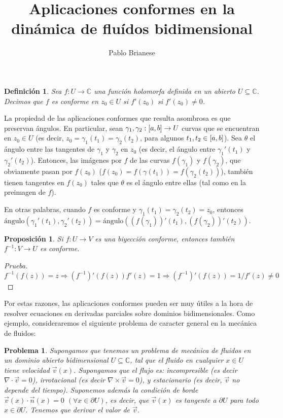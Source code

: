 \documentclass{article}
\title{Aplicaciones conformes en la dinámica de fluídos bidimensional}
\author{Pablo Brianese}
\newcommand{\complexNumbers}{\mathbb{C}}
\newcommand{\leftOpenInterval}{\left]}
\newcommand{\rightOpenInterval}{\right[}
\newcommand{\leftClosedInterval}{\left[}
\newcommand{\rightClosedInterval}{\right]}
\newcommand{\interval}[3]{%
    \ifstrequal{#1}{oo}{%
      \leftOpenInterval #2, #3 \rightOpenInterval%
    }{%
      \ifstrequal{#1}{co}{%
        \leftClosedInterval #2, #3 \rightOpenInterval%
      }{%
        \ifstrequal{#1}{oc}{
          \leftOpenInterval #2, #3 \rightClosedInterval%
        }{%
          \ifstrequal{#1}{cc}{
            \leftClosedInterval #2, #3 \rightClosedInterval
          }{%
          }%
        }%
      }%
    }%
  }
\newtheorem{proposition}{Proposición}
\newtheorem{problem}{Problema}
\newtheorem{definition}{Definición}
\theoremstyle{remark}
\begin{document}
  \maketitle
  \begin{definition}
    Sea \(f : U \rightarrow \complexNumbers\) una función holomorfa definida en un abierto \(U \subseteq \complexNumbers\).
    Decimos que \(f\) es conforme en \(z_0 \in U\) si \(f'(z_0)\) si \(f'(z_0) \neq 0\).
  \end{definition}

  La propiedad de las aplicaciones conformes que resulta asombrosa es que preservan ángulos.
  En particular, sean \(\gamma_1, \gamma_2 : \interval{cc}{a}{b} \rightarrow U\) curvas que se encuentran en \(z_0 \in U\) (es decir, \(z_0 = \gamma_1(t_1) = \gamma_2(t_2)\), para algunos \(t_1, t_2 \in \interval{cc}{a}{b}\)).
  Sea \(\theta\) el ángulo entre las tangentes de \(\gamma_1\) y \(\gamma_2\) en \(z_0\) (es decir, el ángulo entre \(\gamma_1'(t_1)\) y \(\gamma_2'(t_2)\)).
  Entonces, las imágenes por \(f\) de las curvas \(f(\gamma_1)\) y \(f(\gamma_2)\), que obviamente pasan por \(f(z_0)\) (\(f(z_0) = f(\gamma(t_1)) = f(\gamma_2(t_2))\)), también tienen tangentes en \(f(z_0)\) tales que \(\theta\) es el ángulo entre ellas (tal como en la preimagen de \(f\)).
  
  En otras palabras, cuando \(f\) es conforme y \(\gamma_1(t_1) = \gamma_2(t_2) = z_0\), entonces \(\text{ángulo}(\gamma_1'(t_1), \gamma_2'(t_2)) = \text{ángulo}((f(\gamma_1))'(t_1), (f(\gamma_2))'(t_2))\).

  \begin{proposition}
    Si \(f: U \rightarrow V\) es una biyección conforme, entonces también \(f^{-1} : V \rightarrow U\) es conforme.
  \end{proposition}
  \begin{proof}[Prueba]
    \({f^{-1} (f (z)) = z} \Rightarrow {(f^{- 1})'(f(z)) f'(z) = 1} \Rightarrow {(f^{-1})'(f(z)) = 1 / f'(z) \neq 0}\)
  \end{proof}

  Por estas razones, las aplicaciones conformes pueden ser muy útiles a la hora de resolver ecuaciones en derivadas parciales sobre dominios bidimensionales.
  Como ejemplo, consideraremos el siguiente problema de caracter general en la mecánica de fluidos:

  \begin{problem}
    Supongamos que tenemos un problema de mecánica de fluidos en un dominio abierto bidimensional \(U \subseteq \complexNumbers\), tal que el fluido en cualquier \(x \in U\) tiene velocidad \(\vec{v}(x)\).
    Supongamos que el flujo es:
    incompresible (es decir \(\nabla \cdot \vec{v} = 0\)), irrotacional (es decir \(\nabla \times \vec{v} = 0\)), y estacionario (es decir, \(\vec{v}\) no depende del tiempo).
    Suponemos además la condición de borde \(\vec{v}(x) \cdot \vec{n}(x) = 0\) \((\forall x \in \partial U)\), es decir, que \(\vec{v}(x)\) es tangente a \(\partial U\) para todo \(x \in \partial U\).
    Tenemos que derivar el valor de \(\vec{v}\).
  \end{problem}
\end{document}
